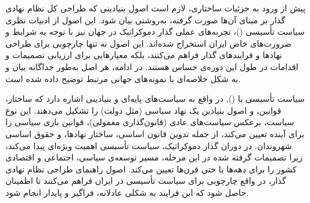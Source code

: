 پیش از ورود به جزئیات ساختاری، لازم است اصول بنیادینی که طراحی کل نظام نهادی گذار
بر مبنای آن‌ها صورت گرفته، به‌روشنی بیان شود. این اصول از ادبیات نظری سیاست
تأسیسی ()، تجربه‌های عملی گذار دموکراتیک در جهان 
نیز با توجه به شرایط و ضرورت‌های خاص ایران استخراج شده‌اند. این اصول نه تنها چارچوبی برای طراحی نهادها و فرایندهای گذار فراهم می‌کنند، بلکه معیارهایی برای ارزیابی تصمیمات و اقدامات در طول این دوره‌ی حساس هستند. در ادامه، هر اصل به‌طور جداگانه بیان و به شکل خلاصه‌ای با نمونه‌های جهانی مرتبط توضیح داده شده است.\par
سیاست تأسیسی یا (), در واقع به سیاست‌های پایه‌ای و بنیادینی اشاره دارد که ساختار، قوانین، و اصول بنیادین یک نهاد سیاسی (مثل دولت) را تشکیل می‌دهند. این نوع سیاست، برعکس سیاست‌های عادی (قانون‌گذاری معمولی)، قوانین بازی سیاسی را برای آینده تعیین می‌کند، از جمله تدوین قانون اساسی، ساختار نهادها، و حقوق اساسی شهروندان. در دوران گذار دموکراتیک، سیاست تأسیسی اهمیت ویژه‌ای پیدا می‌کند، زیرا تصمیمات گرفته شده در این مرحله، مسیر توسعه‌ی سیاسی، اجتماعی و اقتصادی کشور را برای دهه‌ها یا حتی قرن‌ها تعیین می‌کند. اصول راهنمای طراحی نظام نهادی گذار، در واقع چارچوبی برای سیاست تأسیسی در ایران فراهم می‌کنند تا اطمینان حاصل شود که این فرایند به شکلی عادلانه، فراگیر و پایدار انجام شود.


